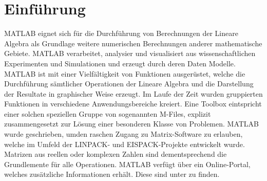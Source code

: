 \section{Einführung}
MATLAB eignet sich für die Durchführung von Berechnungen der Lineare Algebra als Grundlage weitere numerischen Berechnungen anderer mathematische Gebiete.
\newline\newline
MATLAB verarbeitet, analysier und visualisiert aus wissenschaftlichen Experimenten und Simulationen und erzeugt durch deren Daten Modelle.
\newline\newline
MATLAB ist mit einer Vielfältigkeit von Funktionen ausgerüstet, welche die Durchführung sämtlicher Operationen der Lineare Algebra und die Darstellung der Resultate in graphischer Weise erzeugt. Im Laufe der Zeit wurden gruppierten Funktionen in verschiedene Anwendungsbereiche kreiert. Eine Toolbox eintspricht einer solchen speziellen Gruppe von sogenannten M-Files, explizit zusammengesetzt zur Lösung einer besonderen Klasse von Problemen. 
\newline\newline
MATLAB wurde geschrieben, umden raschen Zugang zu Matrix-Software zu erlauben, welche im Umfeld der LINPACK- und EISPACK-Projekte entwickelt wurde. Matrizen aus reellen oder komplexen Zahlen sind dementsprechend die Grundlemente für alle Operationen. 
\newline\newline
MATLAB verfügt über ein Online-Portal, welches zusätzliche Informationen erhält. Diese sind unter  zu finden.
